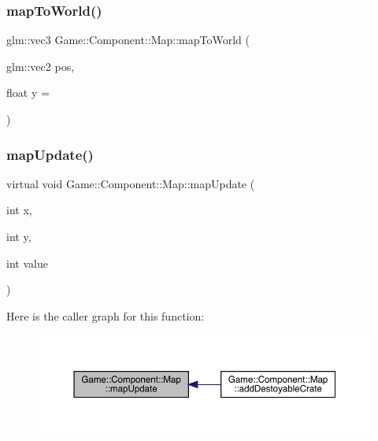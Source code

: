 \subsubsection{\texorpdfstring{map\+To\+World()}{mapToWorld()}}
{\footnotesize\ttfamily glm\+::vec3 Game\+::\+Component\+::\+Map\+::map\+To\+World (\begin{DoxyParamCaption}\item[{glm\+::vec2}]{pos,  }\item[{float}]{y = {} }\end{DoxyParamCaption})}

\mbox{\label{class_game_1_1_component_1_1_map_ae1900809e3369230a8dd3678a397ba98}} 
\subsubsection{\texorpdfstring{map\+Update()}{mapUpdate()}\hspace{0.1cm}{\footnotesize\ttfamily [1/2]}}
{\footnotesize\ttfamily virtual void Game\+::\+Component\+::\+Map\+::map\+Update (\begin{DoxyParamCaption}\item[{int}]{x,  }\item[{int}]{y,  }\item[{int}]{value }\end{DoxyParamCaption})\hspace{0.3cm}{\ttfamily [virtual]}}

Here is the caller graph for this function\+:
\nopagebreak
\begin{figure}[H]
\begin{center}
\leavevmode
\includegraphics[width=350pt]{class_game_1_1_component_1_1_map_ae1900809e3369230a8dd3678a397ba98_icgraph}
\end{center}
\end{figure}
\mbox{\label{class_game_1_1_component_1_1_map_aa62669035c53c17e1a7b680d28514575}} 
